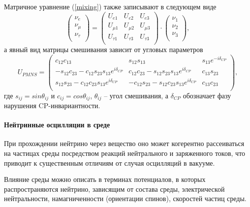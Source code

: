 \documentclass[12pt]{article}
\numberwithin{equation}{section}
\begin{document}
Матричное уравнение (\ref{mixing}) также записывают в следующем виде
\begin{equation}
\begin{pmatrix}
	\nu_{e}\\
	\nu_{\mu}\\
	\nu_{\tau}\\
\end{pmatrix}
\!\!=\!\!
\begin{pmatrix}
	U_{e1}& U_{e2}& U_{e3}\\
	U_{\mu1}& U_{\mu2}& U_{\mu3}\\
	U_{\tau1}& U_{\tau3}& U_{\tau3}\\
\end{pmatrix}
\!\!\cdot\!\!
\begin{pmatrix}
	\nu_{1}\\
	\nu_{2}\\
	\nu_{3}\\
\end{pmatrix},
\end{equation}
а явный вид матрицы смешивания зависит от угловых параметров
\begin{equation}
U_{P\!M\!N\!S}\! =\! 
\begin{pmatrix}
c_{12}c_{13}& s_{12}s_{13}& s_{13}e^{-i\delta_{CP}}\\
-s_{12}c_{23} - c_{12}s_{23}s_{13}e^{i\delta_{CP}}& c_{12}c_{23} - s_{12}s_{23}s_{13}e^{i\delta_{CP}}& c_{13}s_{23}\\
s_{12}s_{23}-c_{12}c_{23}s_{13}e^{i\delta_{CP}}& -c_{12}s_{23}-s_{12}c_{23}s_{13}e^{i\delta_{CP}}& c_{13}c_{23}\\
\end{pmatrix},
\end{equation}
где $s_{ij}=sin\theta_{ij}$ и $c_{ij}=cos\theta_{ij}$, $\theta_{ij}$ -- угол смешивания, а $\delta_{CP}$ обозначает фазу нарушения CP-инвариантности.

\paragraph{\large Нейтринные осцилляции в среде}

При прохождении нейтрино через вещество оно может когерентно рассеиваться на частицах среды посредством реакций нейтрального и заряженного токов, что приводит к существенным отличиям от случая осцилляций в вакууме.

Влияние среды можно описать в терминах потенциалов, в которых распространяются нейтрино, зависящим от состава среды, электрической нейтральности, намагниченности (ориентации спинов), скоростей частиц среды.
\end{document}
